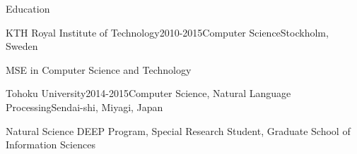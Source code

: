 \documentclass{resume} %
\begin{document}

\begin{rSection}{Education}

\begin{rSubsection}{KTH Royal Institute of Technology}{2010-2015}{Computer Science}{Stockholm, Sweden}
\item MSE in Computer Science and Technology
\end{rSubsection}

\begin{rSubsection}{Tohoku University}{2014-2015}{Computer Science, Natural Language Processing}{Sendai-shi, Miyagi, Japan}
\item Natural Science DEEP Program, Special Research Student, Graduate School of Information Sciences
\end{rSubsection}

\end{rSection}

\end{document}
